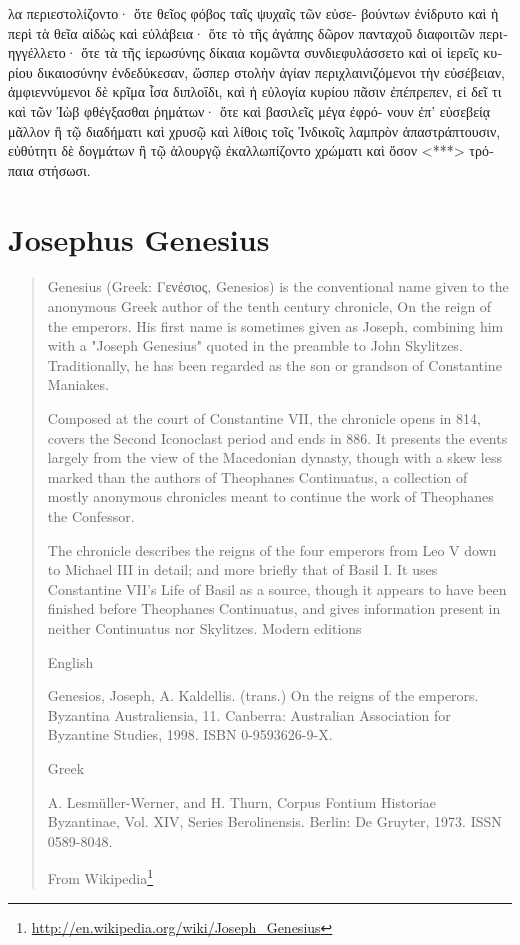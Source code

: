 \documentclass[12pt,letterpaper,twoside,final]{memoir}
\begin{document}
\begin{greek}
λα περιεστολίζοντο· ὅτε θεῖος φόβος ταῖς ψυχαῖς τῶν εὐσε-
βούντων ἐνίδρυτο καὶ ἡ περὶ τὰ θεῖα αἰδὼς καὶ εὐλάβεια· ὅτε 
τὸ τῆς ἀγάπης δῶρον πανταχοῦ διαφοιτῶν περιηγγέλλετο· ὅτε 
τὰ τῆς ἱερωσύνης δίκαια κομῶντα συνδιεφυλάσσετο καὶ οἱ 
ἱερεῖς κυρίου δικαιοσύνην ἐνδεδύκεσαν, ὥσπερ στολὴν ἁγίαν 
περιχλαινιζόμενοι τὴν εὐσέβειαν, ἀμφιεννύμενοι δὲ κρῖμα ἶσα 
διπλοΐδι, καὶ ἡ εὐλογία κυρίου πᾶσιν ἐπέπρεπεν, εἰ δεῖ τι καὶ 
τῶν Ἰὼβ φθέγξασθαι ῥημάτων· ὅτε καὶ βασιλεῖς μέγα ἐφρό-
νουν ἐπ' εὐσεβείᾳ μᾶλλον ἢ τῷ διαδήματι καὶ χρυσῷ καὶ λίθοις 
τοῖς Ἰνδικοῖς λαμπρὸν ἀπαστράπτουσιν, εὐθύτητι δὲ δογμάτων 
ἢ τῷ ἁλουργῷ ἐκαλλωπίζοντο χρώματι καὶ ὅσον <***> 
τρόπαια στήσωσι. 

\end{greek}


\section{Josephus Genesius}
\blockquote[From Wikipedia\footnote{\url{http://en.wikipedia.org/wiki/Joseph_Genesius}}]{

Genesius (Greek: Γενἐσιος, Genesios) is the conventional name given to the anonymous Greek author of the tenth century chronicle, On the reign of the emperors. His first name is sometimes given as Joseph, combining him with a "Joseph Genesius" quoted in the preamble to John Skylitzes. Traditionally, he has been regarded as the son or grandson of Constantine Maniakes.

Composed at the court of Constantine VII, the chronicle opens in 814, covers the Second Iconoclast period and ends in 886. It presents the events largely from the view of the Macedonian dynasty, though with a skew less marked than the authors of Theophanes Continuatus, a collection of mostly anonymous chronicles meant to continue the work of Theophanes the Confessor.

The chronicle describes the reigns of the four emperors from Leo V down to Michael III in detail; and more briefly that of Basil I. It uses Constantine VII's Life of Basil as a source, though it appears to have been finished before Theophanes Continuatus, and gives information present in neither Continuatus nor Skylitzes.
Modern editions

English

    Genesios, Joseph, A. Kaldellis. (trans.) On the reigns of the emperors. Byzantina Australiensia, 11. Canberra: Australian Association for Byzantine Studies, 1998. ISBN 0-9593626-9-X.

Greek

    A. Lesmüller-Werner, and H. Thurn, Corpus Fontium Historiae Byzantinae, Vol. XIV, Series Berolinensis. Berlin: De Gruyter, 1973. ISSN 0589-8048.

}
\end{document}
